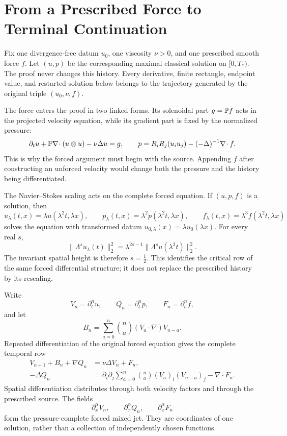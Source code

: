 \section{From a Prescribed Force to Terminal Continuation}
\label{sec:forced-argument-overview}
\label{guide:how-proof-works}

Fix one divergence-free datum \(u_0\), one viscosity \(\nu>0\), and one
prescribed smooth force \(f\).  Let \((u,p)\) be the corresponding maximal
classical solution on \([0,T_*)\).  The proof never changes this history.
Every derivative, finite rectangle, endpoint value, and restarted solution
below belongs to the trajectory generated by the original triple
\((u_0,\nu,f)\).

The force enters the proof in two linked forms.  Its solenoidal part
\(g=\mathbb P f\) acts in the projected velocity equation, while its gradient part
is fixed by the normalized pressure:
\[
 \partial_tu+\mathbb P\nabla\!\cdot(u\otimes u)-\nu\Delta u=g,
 \qquad
 p=R_iR_j(u_i u_j)-(-\Delta)^{-1}\nabla\!\cdot f.
\]
This is why the forced argument must begin with the source.  Appending
\(f\) after constructing an unforced velocity would change both the pressure
and the history being differentiated.

The Navier--Stokes scaling acts on the complete forced equation.  If
\((u,p,f)\) is a solution, then
\[
 u_\lambda(t,x)=\lambda u(\lambda^2t,\lambda x),\qquad
 p_\lambda(t,x)=\lambda^2p(\lambda^2t,\lambda x),\qquad
 f_\lambda(t,x)=\lambda^3f(\lambda^2t,\lambda x)
\]
solves the equation with transformed datum
\(u_{0,\lambda}(x)=\lambda u_0(\lambda x)\).  For every real \(s\),
\[
 \|\Lambda^su_\lambda(t)\|_2^2
 =\lambda^{2s-1}\|\Lambda^su(\lambda^2t)\|_2^2.
\]
The invariant spatial height is therefore \(s=\tfrac12\).  This identifies
the critical row of the same forced differential structure; it does not
replace the prescribed history by its rescaling.

Write
\[
 V_n=\partial_t^nu,\qquad Q_n=\partial_t^np,
 \qquad F_n=\partial_t^nf,
\]
and let
\[
 B_n=\sum_{a=0}^n\binom na(V_a\cdot\nabla)V_{n-a}.
\]
Repeated differentiation of the original forced equation gives the complete
temporal row
\begin{align}
 V_{n+1}+B_n+\nabla Q_n&=\nu\Delta V_n+F_n,
 \label{eq:guide-forced-row}\\
 -\Delta Q_n
 &=\partial_i\partial_j\sum_{a=0}^n\binom na
      (V_a)_i(V_{n-a})_j-\nabla\!\cdot F_n.
 \label{eq:guide-forced-pressure}
\end{align}
Spatial differentiation distributes through both velocity factors and through
the prescribed source.  The fields
\[
 \partial_x^\alpha V_n,\qquad
 \partial_x^\alpha Q_n,\qquad
 \partial_x^\alpha F_n
\]
form the pressure-complete forced mixed jet.  They are coordinates of one
solution, rather than a collection of independently chosen functions.

